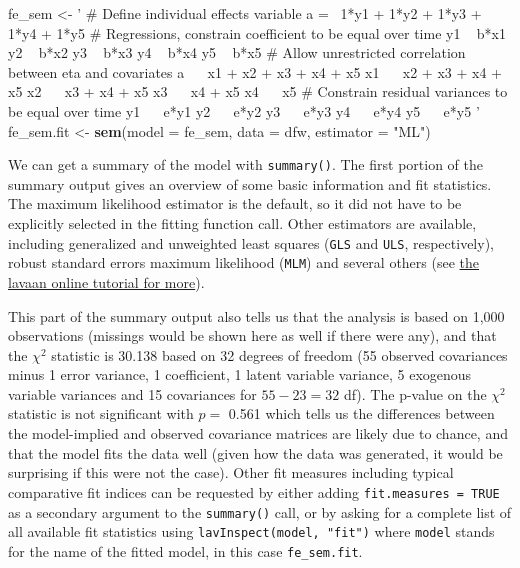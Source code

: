 \documentclass[]{interact}
\theoremstyle{plain}%
\theoremstyle{definition}
\theoremstyle{remark}
\newenvironment{Shaded}{\begin{snugshade}}{\end{snugshade}}
\newcommand{\DataTypeTok}[1]{\textcolor[rgb]{0.13,0.29,0.53}{#1}}
\newcommand{\KeywordTok}[1]{\textcolor[rgb]{0.13,0.29,0.53}{\textbf{#1}}}
\newcommand{\NormalTok}[1]{#1}
\newcommand{\StringTok}[1]{\textcolor[rgb]{0.31,0.60,0.02}{#1}}
\begin{document}
\singlespacing

\begin{Shaded}
\begin{Highlighting}[]
\NormalTok{fe_sem <-}\StringTok{ '}
\StringTok{# Define individual effects variable }
\StringTok{a =~ 1*y1 + 1*y2 + 1*y3 + 1*y4 + 1*y5}
\StringTok{# Regressions, constrain coefficient to be equal over time}
\StringTok{y1 ~ b*x1}
\StringTok{y2 ~ b*x2 }
\StringTok{y3 ~ b*x3}
\StringTok{y4 ~ b*x4}
\StringTok{y5 ~ b*x5}
\StringTok{# Allow unrestricted correlation between eta and covariates}
\StringTok{a ~~ x1 + x2 + x3 + x4 + x5}
\StringTok{x1 ~~ x2 + x3 + x4 + x5}
\StringTok{x2 ~~ x3 + x4 + x5}
\StringTok{x3 ~~ x4 + x5}
\StringTok{x4 ~~ x5}
\StringTok{# Constrain residual variances to be equal over time}
\StringTok{y1 ~~ e*y1}
\StringTok{y2 ~~ e*y2}
\StringTok{y3 ~~ e*y3}
\StringTok{y4 ~~ e*y4}
\StringTok{y5 ~~ e*y5}
\StringTok{'}
\NormalTok{fe_sem.fit <-}\StringTok{ }\KeywordTok{sem}\NormalTok{(}\DataTypeTok{model =}\NormalTok{ fe_sem, }
                  \DataTypeTok{data =}\NormalTok{ dfw, }
                  \DataTypeTok{estimator =} \StringTok{"ML"}\NormalTok{)}
\end{Highlighting}
\end{Shaded}

\doublespacing

\singlespacing

\doublespacing

We can get a summary of the model with \texttt{summary()}. The first
portion of the summary output gives an overview of some basic
information and fit statistics. The maximum likelihood estimator is the
default, so it did not have to be explicitly selected in the fitting
function call. Other estimators are available, including generalized and
unweighted least squares (\texttt{GLS} and \texttt{ULS}, respectively),
robust standard errors maximum likelihood (\texttt{MLM}) and several
others (see \href{https://lavaan.ugent.be/tutorial/est.html}{the lavaan
online tutorial for more}).

This part of the summary output also tells us that the analysis is based
on 1,000 observations (missings would be shown here as well if there
were any), and that the \(\chi^{2}\) statistic is 30.138 based on 32
degrees of freedom (55 observed covariances minus 1 error variance, 1
coefficient, 1 latent variable variance, 5 exogenous variable variances
and 15 covariances for \(55 - 23 = 32\) df). The p-value on the
\(\chi^{2}\) statistic is not significant with \(p =\) 0.561 which tells
us the differences between the model-implied and observed covariance
matrices are likely due to chance, and that the model fits the data well
(given how the data was generated, it would be surprising if this were
not the case). Other fit measures including typical comparative fit
indices can be requested by either adding \texttt{fit.measures\ =\ TRUE}
as a secondary argument to the \texttt{summary()} call, or by asking for
a complete list of all available fit statistics using
\texttt{lavInspect(model,\ "fit")} where \texttt{model} stands for the
name of the fitted model, in this case \texttt{fe\_sem.fit}.
\end{document}
